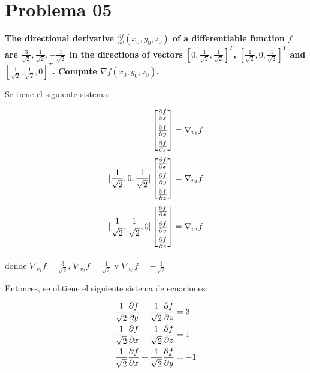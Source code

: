 \section*{Problema 05}

\textbf{The directional derivative $\frac{\partial f}{\partial v}(x_0,y_0,z_0)$ of a differentiable function $f$ are $\frac{3}{\sqrt{2}}, \frac{1}{\sqrt{2}}, -\frac{1}{\sqrt{2}}$ in the directions of vectors $[0,\frac{1}{\sqrt{2}},\frac{1}{\sqrt{2}}]^T$, $[\frac{1}{\sqrt{2}},0,\frac{1}{\sqrt{2}}]^T$ and $[\frac{1}{\sqrt{2}},\frac{1}{\sqrt{2}},0]^T$. Compute $\nabla f (x_0,y_0,z_0)$.}

Se tiene el siguiente sistema:

\begin{align*}
    [0,\frac{1}{\sqrt{2}},\frac{1}{\sqrt{2}}]
    \begin{bmatrix}
        \dpartial{f}{x} \\[6pt] \dpartial{f}{y} \\[6pt] \dpartial{f}{z}
    \end{bmatrix} & = \nabla_{v_1} f \\[3pt]
    [\frac{1}{\sqrt{2}},0,\frac{1}{\sqrt{2}}]
    \begin{bmatrix}
        \dpartial{f}{x} \\[6pt] \dpartial{f}{y} \\[6pt] \dpartial{f}{z}
    \end{bmatrix} & = \nabla_{v_2} f \\[3pt]
    [\frac{1}{\sqrt{2}},\frac{1}{\sqrt{2}},0]
    \begin{bmatrix}
        \dpartial{f}{x} \\[6pt] \dpartial{f}{y} \\[6pt] \dpartial{f}{z}
    \end{bmatrix} & = \nabla_{v_3} f \\[3pt]
\end{align*}

donde $\nabla_{v_1} f = \frac{3}{\sqrt{2}}$, $\nabla_{v_2} f = \frac{1}{\sqrt{2}}$ y $\nabla_{v_3} f = -\frac{1}{\sqrt{2}}$

Entonces, se obtiene el siguiente sistema de ecuaciones:

\begin{align*}
    \frac{1}{\sqrt{2}}   \frac{\partial f}{\partial y} +\frac{1}{\sqrt{2}} \frac{\partial f}{\partial z} & = 3  \\
    \frac{1}{\sqrt{2}}  \frac{\partial f}{\partial x} + \frac{1}{\sqrt{2}}\frac{\partial f}{\partial z}  & = 1  \\
    \frac{1}{\sqrt{2}}  \frac{\partial f}{\partial x} + \frac{1}{\sqrt{2}}\frac{\partial f}{\partial y}  & = -1
\end{align*}

